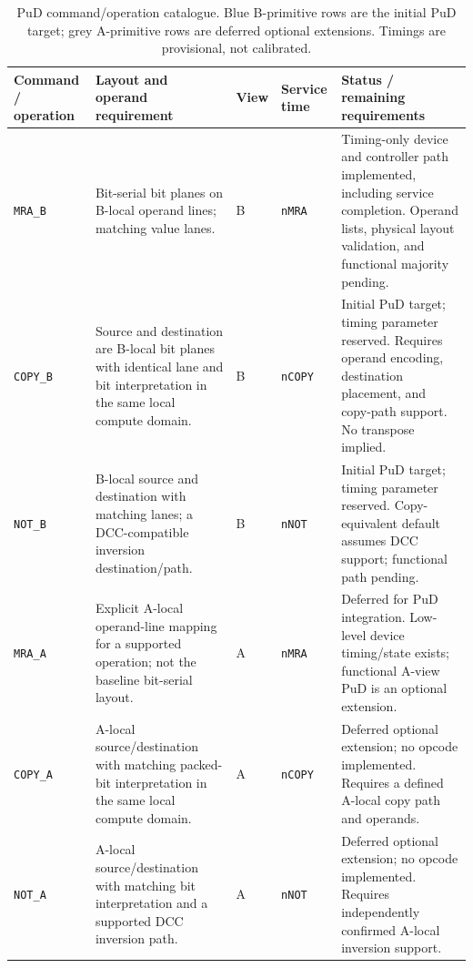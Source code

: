 \documentclass[9pt,twocolumn]{extarticle}
\newcommand{\cmd}[1]{\texttt{#1}}
\newcommand{\param}[1]{\texttt{#1}}
\newcommand{\deferredcell}[1]{\textcolor{DDRAMDeferred}{#1}}
\begin{document}
\begin{table}[t]
\centering
\small
\caption{PuD command/operation catalogue. Blue B-primitive rows are the initial
PuD target; grey A-primitive rows are deferred optional extensions.
Timings are provisional, not calibrated.}
\label{tab:pud-catalogue}
\begin{tabularx}{\textwidth}{@{}p{}p{}p{}p{}X@{}}
\toprule
Command / operation & Layout and operand requirement & View & Service time & Status / remaining requirements \\
\midrule
\rowcolor{DDRAMBlue!10}\cmd{MRA\_B} & Bit-serial bit planes on B-local operand lines; matching value lanes. & B & \param{nMRA} & Timing-only device and controller path implemented, including service completion. Operand lists, physical layout validation, and functional majority pending. \\
\rowcolor{DDRAMBlue!10}\cmd{COPY\_B} & Source and destination are B-local bit planes with identical lane and bit interpretation in the same local compute domain. & B & \param{nCOPY} & Initial PuD target; timing parameter reserved. Requires operand encoding, destination placement, and copy-path support. No transpose implied. \\
\rowcolor{DDRAMBlue!10}\cmd{NOT\_B} & B-local source and destination with matching lanes; a DCC-compatible inversion destination/path. & B & \param{nNOT} & Initial PuD target; timing parameter reserved. Copy-equivalent default assumes DCC support; functional path pending. \\
\rowcolor{DDRAMGrey}\deferredcell{\cmd{MRA\_A}} & \deferredcell{Explicit A-local operand-line mapping for a supported operation; not the baseline bit-serial layout.} & \deferredcell{A} & \deferredcell{\param{nMRA}} & \deferredcell{Deferred for PuD integration. Low-level device timing/state exists; functional A-view PuD is an optional extension.} \\
\rowcolor{DDRAMGrey}\deferredcell{\cmd{COPY\_A}} & \deferredcell{A-local source/destination with matching packed-bit interpretation in the same local compute domain.} & \deferredcell{A} & \deferredcell{\param{nCOPY}} & \deferredcell{Deferred optional extension; no opcode implemented. Requires a defined A-local copy path and operands.} \\
\rowcolor{DDRAMGrey}\deferredcell{\cmd{NOT\_A}} & \deferredcell{A-local source/destination with matching bit interpretation and a supported DCC inversion path.} & \deferredcell{A} & \deferredcell{\param{nNOT}} & \deferredcell{Deferred optional extension; no opcode implemented. Requires independently confirmed A-local inversion support.} \\

\end{tabularx}
\end{table}
\end{document}

